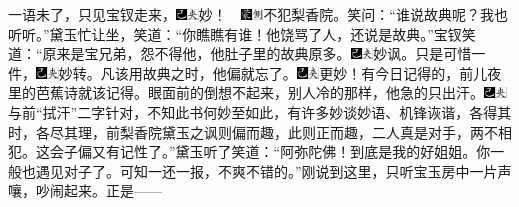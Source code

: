 一语未了，只见宝钗走来，{\includegraphics[width=3mm]{../Images/00003}\includegraphics[width=3mm]{../Images/00012}\footnotesize \kaishu 妙！　\includegraphics[width=3mm]{../Images/00006}\includegraphics[width=3mm]{../Images/00011}\footnotesize \kaishu 不犯梨香院。}笑问：``谁说故典呢？我也听听。''黛玉忙让坐，笑道：``你瞧瞧有谁！他饶骂了人，还说是故典。''宝钗笑道：``原来是宝兄弟，怨不得他，他肚子里的故典原多。{\includegraphics[width=3mm]{../Images/00003}\includegraphics[width=3mm]{../Images/00012}\footnotesize \kaishu 妙讽。}只是可惜一件，{\includegraphics[width=3mm]{../Images/00003}\includegraphics[width=3mm]{../Images/00012}\footnotesize \kaishu 妙转。}凡该用故典之时，他偏就忘了。{\includegraphics[width=3mm]{../Images/00003}\includegraphics[width=3mm]{../Images/00012}\footnotesize \kaishu 更妙！}有今日记得的，前儿夜里的芭蕉诗就该记得。眼面前的倒想不起来，别人冷的那样，他急的只出汗。{\includegraphics[width=3mm]{../Images/00003}\includegraphics[width=3mm]{../Images/00012}\footnotesize \kaishu 与前``拭汗''二字针对，不知此书何妙至如此，有许多妙谈妙语、机锋诙谐，各得其时，各尽其理，前梨香院黛玉之讽则偏而趣，此则正而趣，二人真是对手，两不相犯。}这会子偏又有记性了。''黛玉听了笑道：``阿弥陀佛！到底是我的好姐姐。你一般也遇见对子了。可知一还一报，不爽不错的。''刚说到这里，只听宝玉房中一片声嚷，吵闹起来。正是------


